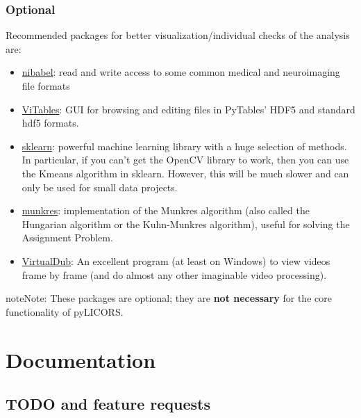 \documentclass[letterpaper,10pt,english]{sphinxmanual}
\begin{document}
\subsection{Optional}
\label{installation:optional}
Recommended packages for better visualization/individual checks of the analysis are:
\begin{itemize}
\item {} 
\href{http://nipy.sourceforge.net/nibabel/}{nibabel}: read and write access to some common medical and neuroimaging file formats

\item {} 
\href{http://vitables.org/}{ViTables}: GUI for browsing and editing files in PyTables' HDF5 and standard hdf5 formats.

\item {} 
\href{http://scikit-learn.org/stable/}{sklearn}: powerful machine learning library with a huge selection of methods. In particular, if you can't get
the OpenCV library to work, then you can use the Kmeans algorithm in sklearn. However, this will be much slower and can only be used for
small data projects.

\item {} 
\href{http://pypi.python.org/pypi/munkres/}{munkres}: implementation of the Munkres algorithm (also called the Hungarian algorithm or the Kuhn-Munkres algorithm),
useful for solving the Assignment Problem.

\item {} 
\href{http://www.virtualdub.org}{VirtualDub}: An excellent program (at least on Windows) to view videos frame by frame (and do
almost any other imaginable video processing).

\end{itemize}

\begin{notice}{note}{Note:}
These packages are optional; they are \textbf{not necessary} for the core functionality
of pyLICORS.
\end{notice}


\chapter{Documentation}
\label{index:documentation}

\section{TODO and feature requests}
\label{TODO:todo}\label{TODO::doc}\label{TODO:todo-and-feature-requests}
\end{document}

